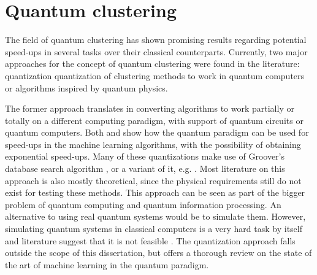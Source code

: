 %
%

\section{Quantum clustering}
\label{sec:quantum clustering}


The field of quantum clustering has shown promising results regarding potential speed-ups in several tasks over their classical counterparts. 
Currently, two major approaches for the concept of quantum clustering were found in the literature: quantization quantization of clustering methods to work in quantum computers or algorithms inspired by quantum physics.

The former approach translates in converting algorithms to work partially or totally on a different computing paradigm, with support of quantum circuits or quantum computers.
Both \citet{Aimeur2013} and \citet{Lloyd2013} show how the quantum paradigm can be used for speed-ups in the machine learning algorithms, with the possibility of obtaining exponential speed-ups.
Many of these quantizations make use of Groover's database search algorithm \cite{grover1996fast}, or a variant of it, e.g. \citet{Wiebe2014}.
Most literature on this approach is also mostly theoretical, since the physical requirements still do not exist for testing these methods.
This approach can be seen as part of the bigger problem of quantum computing and quantum information processing.
An alternative to using real quantum systems would be to simulate them.
However, simulating quantum systems in classical computers is a very hard task by itself and literature suggest that it is not feasible \cite{Feynman1982}.
The quantization approach falls outside the scope of this dissertation, but \citet{wittek2014quantum} offers a thorough review on the state of the art of machine learning in the quantum paradigm.

